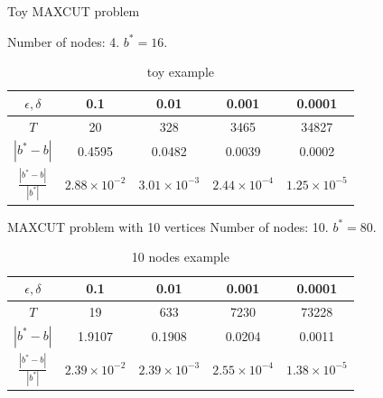 \documentclass{beamer}
\begin{document}
\begin{frame}{Toy MAXCUT problem}

Number of nodes: 4. $b^* = 16$.

\begin{table}[htbp]\label{toytable}
\centering\small
\begin{tabular}{||c|c|c|c|c||}
\hline
$\epsilon, \delta$ & 0.1 & 0.01 & 0.001 & 0.0001 \\
\hline
$T$ & 20 & 328 & 3465  & 34827 \\
\hline
$|b^* - b|$ & 0.4595 & 0.0482 & 0.0039 & 0.0002 \\
\hline
$\frac{|b^* - b|}{|b^*|}$ & $2.88\times 10^{-2}$ &  $3.01\times 10^{-3}$  & $2.44\times 10^{-4}$ &  $1.25\times 10^{-5}$\\
\hline
\end{tabular}
\caption{toy example}
\end{table}


\end{frame}

\begin{frame}{MAXCUT problem with 10 vertices}
Number of nodes: 10. $b^* = 80$. 
\begin{table}[htbp]\label{10nodestable}
\centering\small

\begin{tabular}{||c|c|c|c|c||}
\hline
$\epsilon, \delta$ & 0.1 & 0.01 & 0.001 & 0.0001 \\
\hline
$T$ & 19 & 633 & 7230 & 73228 \\
\hline
$|b^* - b|$ & 1.9107 & 0.1908 & 0.0204 & 0.0011 \\
\hline
$\frac{|b^* - b|}{|b^*|}$ & $2.39\times 10^{-2}$ &  $2.39\times 10^{-3}$  & $2.55\times 10^{-4}$ &  $1.38\times 10^{-5}$\\
\hline
\end{tabular}
\caption{10 nodes example}
\end{table}
\end{frame}
\end{document}
